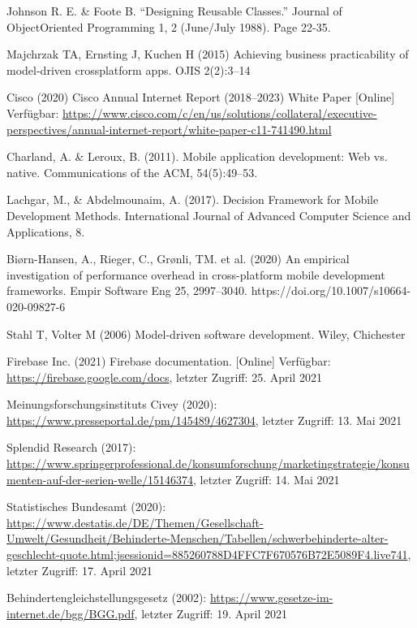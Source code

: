 \documentclass[11pt,a4paper]{article}
\begin{document}
\begin{itemize}
	 Johnson R. E. \&  Foote B. “Designing Reusable Classes.” Journal of ObjectOriented Programming 1, 2 (June/July 1988). Page 22-35.

	 Majchrzak TA, Ernsting J, Kuchen H (2015) Achieving business practicability of model-driven crossplatform apps. OJIS 2(2):3–14

	 Cisco (2020) Cisco Annual Internet Report (2018–2023) White Paper [Online] Verfügbar: \url{https://www.cisco.com/c/en/us/solutions/collateral/executive-perspectives/annual-internet-report/white-paper-c11-741490.html}

	 Charland, A. \& Leroux, B. (2011). Mobile application development: Web vs. native. Communications of the ACM, 54(5):49–53.

	 Lachgar, M., \& Abdelmounaim, A. (2017). Decision Framework for Mobile Development Methods. International Journal of Advanced Computer Science and Applications, 8.

	 Biørn-Hansen, A., Rieger, C., Grønli, TM. et al. (2020) An empirical investigation of performance overhead in cross-platform mobile development frameworks. Empir Software Eng 25, 2997–3040. https://doi.org/10.1007/s10664-020-09827-6

	 Stahl T, Volter M (2006) Model-driven software development. Wiley, Chichester

	 Firebase Inc. (2021) Firebase documentation. [Online] Verfügbar: \url{https://firebase.google.com/docs}, letzter Zugriff: 25. April 2021

     Meinungsforschungsinstituts Civey (2020):  \url{https://www.presseportal.de/pm/145489/4627304}, letzter Zugriff: 13. Mai 2021

     Splendid Research (2017): \url{https://www.springerprofessional.de/konsumforschung/marketingstrategie/konsumenten-auf-der-serien-welle/15146374}, letzter Zugriff: 14. Mai 2021

     Statistisches Bundesamt (2020): \url{https://www.destatis.de/DE/Themen/Gesellschaft-Umwelt/Gesundheit/Behinderte-Menschen/Tabellen/schwerbehinderte-alter-geschlecht-quote.html;jsessionid=885260788D4FFC7F670576B72E5089F4.live741}, letzter Zugriff: 17. April 2021

     Behindertengleichstellungsgesetz (2002): \url{https://www.gesetze-im-internet.de/bgg/BGG.pdf}, letzter Zugriff: 19. April 2021


\end{itemize}
\end{document}
